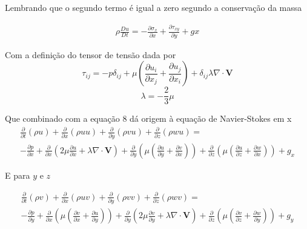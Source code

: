 \documentclass[]{article}
\begin{document}
Lembrando que o segundo termo é igual a zero segundo a conservação da massa

\begin{equation}
	\begin{aligned}
		\rho \frac{ Du}{Dt} = - \frac{\partial \sigma_{x}}{\partial x} +  \frac{\partial \tau_{xy}}{\partial y} + gx   
	\end{aligned}
\end{equation}

Com a definição do tensor de tensão dada por
\begin{equation}
	\tau_{ij} = -p \delta_{ij} + \mu \left( \frac{\partial u_i}{\partial x_j} + \frac{\partial u_j}{\partial x_i} \right) + \delta_{ij} \lambda \nabla \cdot \mathbf{V}
\end{equation}
\begin{equation}
	\lambda = -\frac{2}{3} \mu
\end{equation}

Que combinado com a equação 8 dá origem à equação de Navier-Stokes em x
\begin{equation}
	\begin{aligned}
	\frac{\partial}{\partial t} (\rho u) + \frac{\partial}{\partial x} (\rho u u) + \frac{\partial}{\partial y} (\rho v u) + \frac{\partial}{\partial z} (\rho w u) = \\
	- \frac{\partial p}{\partial x} + \frac{\partial}{\partial x} \left( 2 \mu \frac{\partial u}{\partial x} + \lambda \nabla \cdot \mathbf{V} \right) +
	\frac{\partial}{\partial y} \left( \mu \left( \frac{\partial u}{\partial y} + \frac{\partial v}{\partial x} \right) \right) +
	\frac{\partial}{\partial z} \left( \mu \left( \frac{\partial u}{\partial z} + \frac{\partial w}{\partial x} \right) \right) + g_x
	\end{aligned}
\end{equation}

E para $y$ e $z$

\begin{equation}
	\begin{aligned}
	\frac{\partial}{\partial t} (\rho v) + \frac{\partial}{\partial x} (\rho u v) + \frac{\partial}{\partial y} (\rho v v) + \frac{\partial}{\partial z} (\rho w v) = \\
	- \frac{\partial p}{\partial y} + \frac{\partial}{\partial x} \left( \mu \left( \frac{\partial v}{\partial x} + \frac{\partial u}{\partial y} \right) \right) +
	\frac{\partial}{\partial y} \left( 2 \mu \frac{\partial v}{\partial y} + \lambda \nabla \cdot \mathbf{V} \right) +
	\frac{\partial}{\partial z} \left( \mu \left( \frac{\partial v}{\partial z} + \frac{\partial w}{\partial y} \right) \right) +  g_y
	\end{aligned}
\end{equation}
\end{document}

